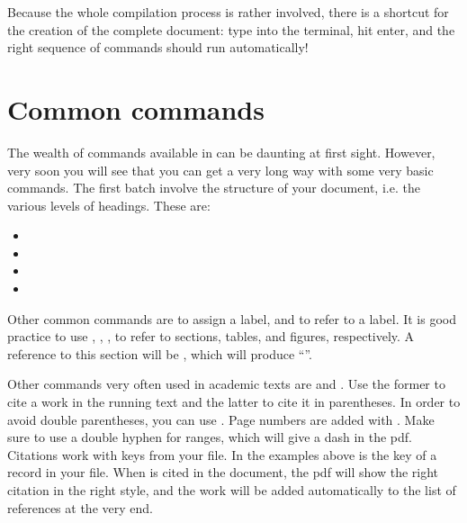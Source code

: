 Because the whole compilation process is rather involved, there is a shortcut for the creation of the complete document: type  into the terminal, hit enter, and the right sequence of commands should run automatically!


\section{Common commands}\label{sec:latex:commoncommands}
The wealth of commands available in \latex can be daunting at first sight. However, very soon you will see that you can get a very long way with some very basic commands. The first batch involve the structure of your document, i.e. the various levels of headings. These are:
\begin{itemize}
 \item {}
\item {}
\item {}
\item {}
\end{itemize}
 
Other common commands are 
to assign a label, and 
to refer to a label. It is good practice to use 
,
,
,
to refer to sections, tables, and figures, respectively. A reference to this section will be , which will produce ``''.

Other commands very often used in academic texts are  and . Use the former to cite a work in the running text and the latter to cite it in parentheses. In order to avoid double parentheses, you can use  . Page numbers are added with . Make sure to use a double hyphen for ranges, which will give a dash in the pdf. Citations work with keys from your \bibtex file. In the examples above  is the key of a record in your \bibtex file. When  is cited in the document, the pdf will show the right citation in the right style, and the work will be added automatically to the list of references at the very end.

